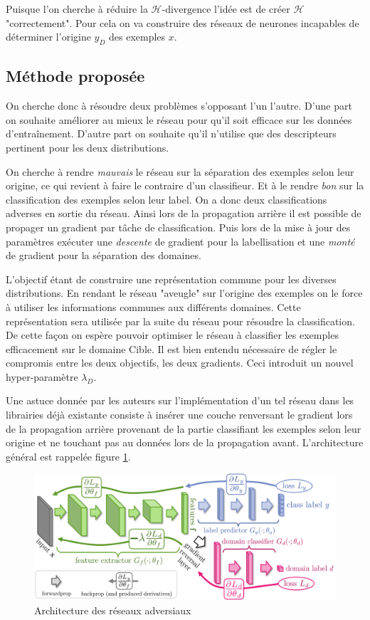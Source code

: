 Puisque l'on cherche à réduire la $\mathcal{H}\text{-divergence}$ l'idée est 
de créer $\mathcal{H}$ "correctement".
Pour cela on va construire des réseaux de neurones incapables de déterminer
l'origine $y_D$ des exemples $x$.

\subsection{Méthode proposée} %
\label{sub:methode}

On cherche donc à résoudre deux problèmes s'opposant l'un l'autre. D'une part
on souhaite améliorer au mieux le réseau pour qu'il soit efficace sur les
données d'entraînement. D'autre part on souhaite qu'il n'utilise que des 
descripteurs pertinent pour les deux distributions.

On cherche à rendre \emph{mauvais} le réseau sur la séparation des exemples
selon leur origine, ce qui revient à faire le contraire d'un classifieur. Et
à le rendre \emph{bon} sur la classification des exemples selon leur label.
On a donc deux classifications adverses en sortie du réseau.
Ainsi lors de la propagation arrière il est possible de propager un gradient
par tâche de classification. Puis lors de la mise à jour des paramètres 
exécuter une \emph{descente} de gradient pour la labellisation et une 
\emph{monté} de gradient pour la séparation des domaines.

L'objectif étant de construire une représentation commune pour les diverses 
distributions. En rendant le réseau "aveugle" sur l'origine des exemples
on le force à utiliser les informations communes aux différents domaines.
Cette représentation sera utilisée par la suite du réseau pour résoudre la
classification.
De cette façon on espère pouvoir optimiser le réseau à classifier les exemples
efficacement sur le domaine Cible.
Il est bien entendu nécessaire de régler le compromis entre les deux objectifs,
les deux gradients. Ceci introduit un nouvel hyper-paramètre $\lambda_{D}$.

Une astuce donnée par les auteurs sur l'implémentation d'un tel réseau dans 
les librairies déjà existante consiste à insérer une couche renversant le 
gradient lors de la propagation arrière provenant de la partie classifiant
les exemples selon leur origine et ne touchant pas au données lors 
de la propagation avant. L'architecture général est rappelée figure 
\ref{fig:arch}.

\begin{figure}[htbp]
\centering
\includegraphics[width=\textwidth]{fig/arch.png}
\caption{Architecture des réseaux adversiaux}
\label{fig:arch}
\end{figure}


